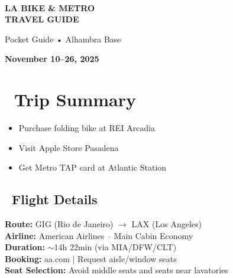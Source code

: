 \documentclass[10pt,letterpaper]{article}
\begin{document}
\begin{center}
\vspace*{2in}

{\Huge\bfseries\color{primary} \faPlane\ \faBicycle\ \faSubway}

\vspace{0.5in}

{\Huge\bfseries\color{primary} LA BIKE \& METRO\\[0.2in] TRAVEL GUIDE}

\vspace{0.3in}

{\Large Pocket Guide • Alhambra Base}

\vspace{1in}

{\LARGE\bfseries November 10--26, 2025}

\vspace*{\fill}
\end{center}

\newpage


\section*{\faClipboard\ Trip Summary}

\begin{warningbox}[title=\faBullseye\ FIRST 48 HOURS PRIORITIES:]
\begin{itemize}[leftmargin=0.3in,itemsep=2pt]
\item[\checkmark] Purchase folding bike at REI Arcadia
\item[\checkmark] Visit Apple Store Pasadena
\item[\checkmark] Get Metro TAP card at Atlantic Station
\end{itemize}
\end{warningbox}

\subsection*{\faPlane\ Flight Details}

\begin{infobox}
\textbf{Route:} GIG (Rio de Janeiro) $\rightarrow$ LAX (Los Angeles)\\
\textbf{Airline:} American Airlines -- Main Cabin Economy\\
\textbf{Duration:} $\sim$14h 22min (via MIA/DFW/CLT)\\
\textbf{Booking:} aa.com | Request aisle/window seats\\
\textbf{Seat Selection:} Avoid middle seats and seats near lavatories
\end{infobox}
\end{document}
